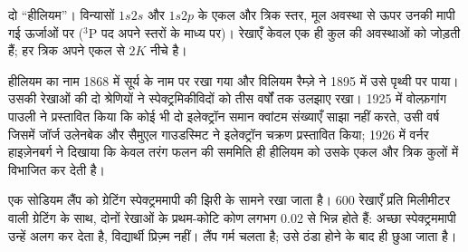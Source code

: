 \begin{omfigure}

{\small दो ``हीलियम''। विन्यासों
$1s2s$ और $1s2p$ के एकल और त्रिक स्तर, मूल अवस्था से ऊपर उनकी मापी गई ऊर्जाओं पर
(${}^3$P पद अपने स्तरों के माध्य पर)। रेखाएँ केवल एक ही कुल की
अवस्थाओं को जोड़ती हैं; हर त्रिक अपने एकल से $2K$ नीचे है।}
\end{omfigure}

\begin{history}[दो हीलियम और अपवर्जन सिद्धांत]
हीलियम का नाम 1868 में सूर्य के नाम पर रखा गया और विलियम रैम्ज़े ने 1895 में
उसे पृथ्वी पर पाया। उसकी रेखाओं की दो श्रेणियों ने स्पेक्ट्रमिकीविदों को तीस
वर्षों तक उलझाए रखा। 1925 में वोल्फ़गांग पाउली ने प्रस्तावित किया कि कोई भी दो इलेक्ट्रॉन
समान क्वांटम संख्याएँ साझा नहीं करते, उसी वर्ष जिसमें जॉर्ज
उलेनबेक और सैमुएल गाउडस्मिट ने इलेक्ट्रॉन चक्रण प्रस्तावित किया; 1926 में वर्नर हाइज़ेनबर्ग ने दिखाया कि
केवल तरंग फलन की सममिति ही हीलियम को उसके एकल और
त्रिक कुलों में विभाजित कर देती है।
\end{history}

\begin{inthelab}[सोडियम द्विक का विभेदन]
एक सोडियम लैंप को ग्रेटिंग स्पेक्ट्रममापी की झिरी के सामने रखा जाता है। 600 रेखाएँ
प्रति मिलीमीटर वाली ग्रेटिंग के साथ, दोनों रेखाओं के प्रथम-कोटि कोण
लगभग \num{0.02}\textdegree{} से भिन्न होते हैं: अच्छा स्पेक्ट्रममापी उन्हें अलग कर देता है,
विद्यार्थी प्रिज़्म नहीं। लैंप गर्म चलता है; उसे ठंडा होने के बाद ही
छुआ जाता है।
\end{inthelab}

